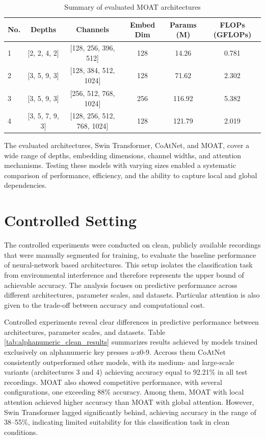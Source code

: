 \documentclass[a4paper,11pt,twoside]{report}
\theoremstyle{definition}
\begin{document}
\begin{table}[h!]
\centering
\caption{Summary of evaluated MOAT architectures}
\begin{adjustbox}{max width=\textwidth}
\begin{tabular}{lccccc}
\hline
\textbf{No.} & \textbf{Depths} & \textbf{Channels} & \textbf{Embed Dim} & \textbf{Params (M)} & \textbf{FLOPs (GFLOPs)} \\
\hline
1 & [2, 2, 4, 2] & [128, 256, 396, 512] & 128 & 14.26 & 0.781 \\
2 & [3, 5, 9, 3] & [128, 384, 512, 1024] & 128 & 71.62 & 2.302 \\
3 & [3, 5, 9, 3] & [256, 512, 768, 1024] & 256 & 116.92 & 5.382 \\
4 & [3, 5, 7, 9, 3] & [128, 256, 512, 768, 1024] & 128 & 121.79 & 2.019 \\
\hline
\end{tabular}
\end{adjustbox}
\label{tab:MOAT_architectures}
\end{table}

The evaluated architectures, Swin Transformer, CoAtNet, and MOAT, cover a wide range of depths, embedding dimensions, channel widths, and attention mechanisms. Testing these models with varying sizes enabled a systematic comparison of performance, efficiency, and the ability to capture local and global dependencies.

\section{Controlled Setting}

The controlled experiments were conducted on clean, publicly available recordings that were manually segmented for training, to evaluate the baseline performance of neural-network based architectures. This setup isolates the classification task from environmental interference and therefore represents the upper bound of achievable accuracy. The analysis focuses on predictive performance across different architectures, parameter scales, and datasets. Particular attention is also given to the trade-off between accuracy and computational cost.

Controlled experiments reveal clear differences in predictive performance between architectures, parameter scales, and datasets. Table \ref{tab:alphanumeric_clean_results} summarizes results achieved by models trained exclusively on alphanumeric key presses a-z0-9. Accross them CoAtNet consistently outperformed other models, with its medium- and large-scale variants (architectures 3 and 4) achieving accuracy equal to 92.21\% in all test recordings. MOAT also showed competitive performance, with several configurations, one exceeding 88\% accuracy. Among them, MOAT with local attention achieved higher accuracy than MOAT with global attention. However, Swin Transformer lagged significantly behind, achieving accuracy in the range of 38–55\%, indicating limited suitability for this classification task in clean conditions.
\end{document}
